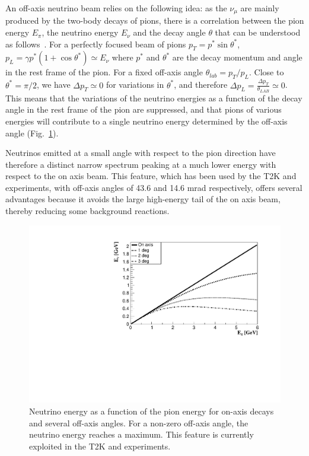 An off-axis neutrino beam \cite{1995bnl} relies on the following idea: as the $\nu_\mu$ are mainly produced by the two-body decays of pions, there is a correlation between the pion energy $E_\pi$, the neutrino energy $E_\nu$ and the decay angle $\theta$ 
that can be understood as follows~\cite{nakaya}. For a perfectly focused beam of pions
$p_T = p^* \sin \theta^*$, $p_L = \gamma p^* (1 + \cos \theta^* ) \simeq E_\nu$
where $p^*$ and $\theta^*$ are the decay momentum and angle in the rest frame of the pion. For a fixed off-axis angle $\theta_{lab} = p_T /p_L$.
Close to $\theta^* = \pi/2$, we have $\Delta p_T \simeq 0 $ for variations in $\theta^*$, and therefore $\Delta p_L = \frac{\Delta p_T}{\theta_{LAB}} \simeq 0$. This means that the variations of the neutrino energies as a function of the decay angle in the rest frame of the pion are suppressed, and that pions of various energies will contribute to a single neutrino energy determined by the off-axis angle (Fig.~\ref{fig:offaxis}).


Neutrinos emitted at a small angle with respect to the pion direction have therefore a distinct narrow spectrum peaking at a much lower energy with respect to the on axis beam. This feature, which has been used by the T2K and \nova experiments, with off-axis angles of 43.6 and 14.6 mrad respectively, offers several advantages because it avoids the large high-energy tail of the on axis beam, thereby reducing some background reactions. 

\begin{figure}[htbp]
\centering
\includegraphics[width=0.6\linewidth]{figures/offaxis.pdf}
  \caption{Neutrino energy as a function of the pion energy for on-axis decays and several off-axis angles. For a non-zero off-axis angle, the neutrino energy reaches a maximum. This feature is currently exploited in the T2K and \nova experiments.}
 \label{fig:offaxis}
 \end{figure}


